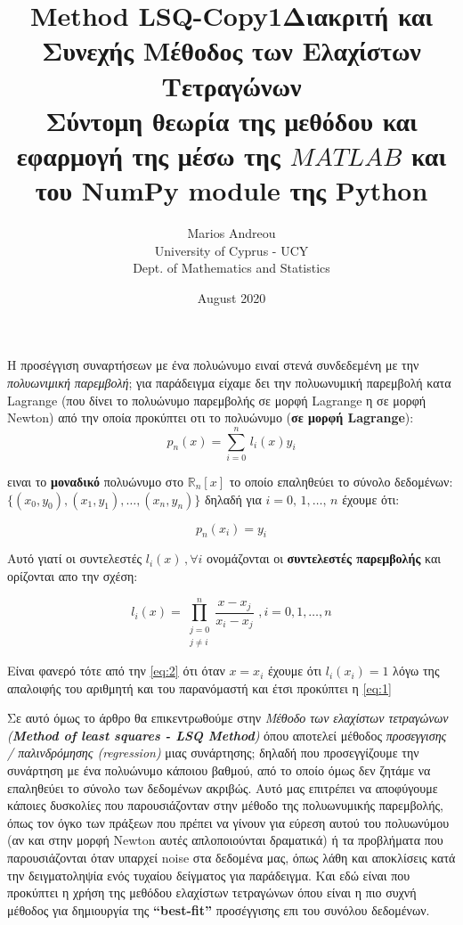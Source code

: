 \documentclass[12pt]{article}
\title{Method LSQ-Copy1}
\title{Διακριτή και Συνεχής Μέθοδος των Ελαχίστων Τετραγώνων\\
\large Σύντομη θεωρία της μεθόδου και εφαρμογή της μέσω της \(MATLAB\) και του NumPy module της Python}
\author{Marios Andreou\\University of Cyprus - UCY\\Dept. of Mathematics and Statistics}
\date{August 2020}
\begin{document}
\renewcommand\contentsname{Περιεχόμενα}
\tableofcontents   
{}
   
\maketitle

Η προσέγγιση συναρτήσεων με ένα πολυώνυμο ειναί στενά συνδεδεμένη με την
\emph{πολυωνιμική παρεμβολή}; για παράδειγμα είχαμε δει την πολυωνυμική
παρεμβολή κατα Lagrange (που δίνει το πολυώνυμο παρεμβολής σε μορφή
Lagrange η σε μορφή Newton) από την οποία προκύπτει οτι το πολυώνυμο
(\textbf{σε μορφή Lagrange}): \[
p_n(x) = \sum^{n}_{i=0} \,l_i(x)y_i \nonumber
\]

ειναι το \textbf{μοναδικό} πολυώνυμο στο \(\mathbb{R}_n[x]\) το οποίο
επαληθεύει το σύνολο δεδομένων:
\(\{(x_0,y_0),(x_1,y_1),\dots,(x_{n},y_{n})\}\) δηλαδή για
\(i=0, \, 1, \dots, \, n\) έχουμε ότι:

\[
p_n(x_i)=y_i \tag{1} \label{eq:1}
\]

Αυτό γιατί οι συντελεστές \(l_i(x) \, , \forall i\) ονομάζονται οι
\textbf{συντελεστές παρεμβολής} και ορίζονται απο την σχέση:

\[
l_i(x)=\prod_{\substack{j=0 \\ j \neq i}}^n \frac{x-x_j}{x_i-x_j} \, \, , i = 0, 1, \dots, n \tag{2} \label{eq:2}
\]

Είναι φανερό τότε από την \eqref{eq:2} ότι όταν \(x=x_i\) έχουμε ότι
\(l_i(x_i)=1\) λόγω της απαλοιφής του αριθμητή και του παρανόμαστή και
έτσι προκύπτει η \eqref{eq:1}

Σε αυτό όμως το άρθρο θα επικεντρωθούμε στην \emph{Μέθοδο των ελαχίστων
τετραγώνων (\textbf{Method of least squares - LSQ Method})} όπου αποτελεί μέθοδος
\emph{προσεγγισης / παλινδρόμησης (regression)} μιας συνάρτησης; δηλαδή
που προσεγγίζουμε την συνάρτηση με ένα πολυώνυμο κάποιου βαθμού, από το
οποίο όμως δεν ζητάμε να επαληθεύει το σύνολο των δεδομένων
ακριβώς. Αυτό μας επιτρέπει να αποφύγουμε κάποιες δυσκολίες που
παρουσιάζονταν στην μέθοδο της πολυωνυμικής παρεμβολής, όπως τον όγκο
των πράξεων που πρέπει να γίνουν για εύρεση αυτού του πολυωνύμου (αν και
στην μορφή Newton αυτές απλοποιούνται δραματικά) ή τα προβλήματα που
παρουσιάζονται όταν υπαρχεί noise στα δεδομένα μας, όπως λάθη και
αποκλίσεις κατά την δειγματοληψία ενός τυχαίου δείγματος για παράδειγμα.
Και εδώ είναι που προκύπτει η χρήση της μεθόδου ελαχίστων τετραγώνων
όπου είναι η πιο συχνή μέθοδος για δημιουργία της \textbf{``best-fit''}
προσέγγισης επι του συνόλου δεδομένων.
\end{document}
